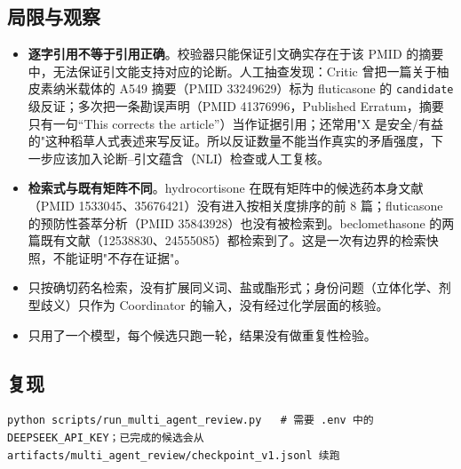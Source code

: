 \documentclass[
  10pt,
]{ctexart}
\providecommand{\tightlist}{%
  \setlength{\itemsep}{0pt}\setlength{\parskip}{0pt}}
\begin{document}
\subsection{局限与观察}\label{ux5c40ux9650ux4e0eux89c2ux5bdf}

\begin{itemize}
\tightlist
\item
  \textbf{逐字引用不等于引用正确}。校验器只能保证引文确实存在于该 PMID
  的摘要中，无法保证引文能支持对应的论断。人工抽查发现：Critic
  曾把一篇关于柚皮素纳米载体的 A549 摘要（PMID 33249629）标为
  fluticasone 的 \texttt{candidate} 级反证；多次把一条勘误声明（PMID
  41376996，Published Erratum，摘要只有一句``This corrects the
  article''）当作证据引用；还常用"X
  是安全/有益的"这种稻草人式表述来写反证。所以反证数量不能当作真实的矛盾强度，下一步应该加入论断--引文蕴含（NLI）检查或人工复核。
\item
  \textbf{检索式与既有矩阵不同}。hydrocortisone
  在既有矩阵中的候选药本身文献（PMID
  1533045、35676421）没有进入按相关度排序的前 8 篇；fluticasone
  的预防性荟萃分析（PMID 35843928）也没有被检索到。beclomethasone
  的两篇既有文献（12538830、24555085）都检索到了。这是一次有边界的检索快照，不能证明"不存在证据"。
\item
  只按确切药名检索，没有扩展同义词、盐或酯形式；身份问题（立体化学、剂型歧义）只作为
  Coordinator 的输入，没有经过化学层面的核验。
\item
  只用了一个模型，每个候选只跑一轮，结果没有做重复性检验。
\end{itemize}

\subsection{复现}\label{ux590dux73b0}

\begin{Verbatim}[breaklines=true,breakanywhere=true]
python scripts/run_multi_agent_review.py   # 需要 .env 中的 DEEPSEEK_API_KEY；已完成的候选会从 artifacts/multi_agent_review/checkpoint_v1.jsonl 续跑
\end{Verbatim}
\end{document}
